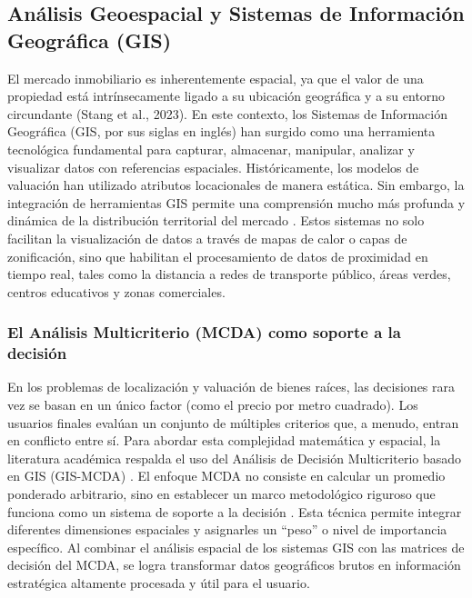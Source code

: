 \subsection{Análisis Geoespacial y Sistemas de Información Geográfica (GIS)}

El mercado inmobiliario es inherentemente espacial, ya que el valor de una propiedad está intrínsecamente ligado a su ubicación geográfica y a su entorno circundante (Stang et al., 2023). En este contexto, los Sistemas de Información Geográfica (GIS, por sus siglas en inglés) han surgido como una herramienta tecnológica fundamental para capturar, almacenar, manipular, analizar y visualizar datos con referencias espaciales. Históricamente, los modelos de valuación han utilizado atributos locacionales de manera estática. Sin embargo, la integración de herramientas GIS permite una comprensión mucho más profunda y dinámica de la distribución territorial del mercado \parencite{DrojEtAl2024}. Estos sistemas no solo facilitan la visualización de datos a través de mapas de calor o capas de zonificación, sino que habilitan el procesamiento de datos de proximidad en tiempo real, tales como la distancia a redes de transporte público, áreas verdes, centros educativos y zonas comerciales.

\subsubsection{El Análisis Multicriterio (MCDA) como soporte a la decisión}

En los problemas de localización y valuación de bienes raíces, las decisiones rara vez se basan en un único factor (como el precio por metro cuadrado). Los usuarios finales evalúan un conjunto de múltiples criterios que, a menudo, entran en conflicto entre sí. Para abordar esta complejidad matemática y espacial, la literatura académica respalda el uso del Análisis de Decisión Multicriterio basado en GIS (GIS-MCDA) \parencite{Malczewski2006}. El enfoque MCDA no consiste en calcular un promedio ponderado arbitrario, sino en establecer un marco metodológico riguroso que funciona como un sistema de soporte a la decisión \parencite{Malczewski2006}. Esta técnica permite integrar diferentes dimensiones espaciales y asignarles un ``peso'' o nivel de importancia específico. Al combinar el análisis espacial de los sistemas GIS con las matrices de decisión del MCDA, se logra transformar datos geográficos brutos en información estratégica altamente procesada y útil para el usuario.

